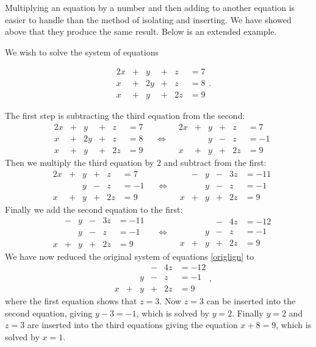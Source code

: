 \documentclass{article}
\begin{document}
Multiplying an equation by a number and then adding to another equation
is easier to handle than the method of isolating and inserting. We have
showed above that they produce the same result. Below is
an extended example.


\begin{example}[showhide]
We wish to solve the system of equations

\begin{equation}\label{origlign}
\begin{matrix}
&2 x &+ &y &+ &z &= 7\\
&x &+ &2y &+ &z &= 8\\
&x &+ &y &+ &2 z &= 9
\end{matrix}.
\end{equation}


The first step is subtracting the third equation from the second:
$$
\begin{matrix}
&2 x &+ &y &+ &z &= 7\\
&x &+ &2y &+ &z &= 8\\
&x &+ &y &+ &2 z &= 9
\end{matrix}\quad\iff
\begin{matrix}
&2 x &+ &y &+ &z &= 7\\
& &  &y &- &z &= -1\\
&x &+  &y &+ &2 z &= 9
\end{matrix}
$$
Then we multiply the third equation by $2$ and subtract from the first:
$$
\begin{matrix}
&2 x &+ &y &+ &z &= 7\\
& &  &y &- &z &= -1\\
&x &+  &y &+ &2 z &= 9
\end{matrix}
\quad\iff
\begin{matrix}
& &-  &y &- &3 z &= -11\\
& &  &y &- &z &= -1\\
&x &+  &y &+ &2 z &= 9
\end{matrix}
$$
Finally we add the second equation to the first:
$$
\begin{matrix}
& &-  &y &- &3 z &= -11\\
& &  &y &- &z &= -1\\
&x &+  &y &+ &2 z &= 9
\end{matrix}\quad\iff
\begin{matrix}
& &  & &- &4 z &= -12\\
& &  &y &- &z &= -1\\
&x &+  &y &+ &2 z &= 9
\end{matrix}
$$
We have now reduced the original system of equations \eqref{origlign} to
$$
\begin{matrix}
& &  & &- &4 z &= -12\\
& &  &y &- &z &= -1\\
&x &+  &y &+ &2 z &= 9
\end{matrix},
$$
where the first equation shows that $z = 3$. Now $z = 3$ can be inserted into
the second equation, giving $y - 3 = -1$, which is solved by $y=2$.
Finally 
$y = 2$ and $z=3$ are inserted into the third equations giving the equation
$x + 8 = 9$, which is solved by $x=1$.


\end{example}
\end{document}
